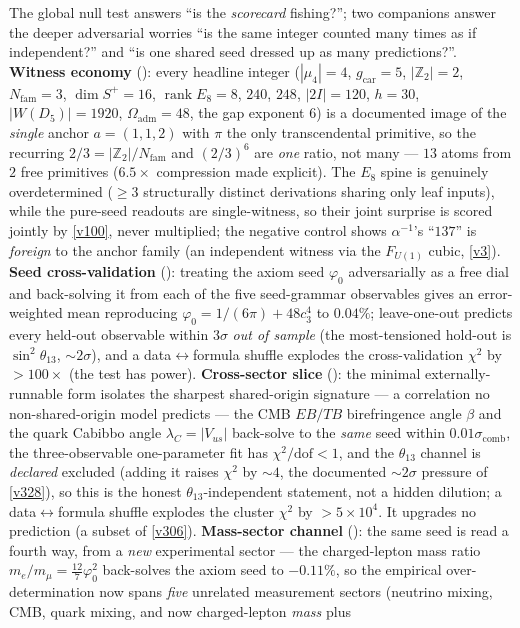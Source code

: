 \documentclass[11pt,a4paper]{article}
\newcommand{\cthree}{c_3}
\newcommand{\Nfam}{N_{\mathrm{fam}}}
\newcommand{\gcar}{g_{\mathrm{car}}}
\providecommand{\Z}{\mathbb{Z}}
\begin{document}
\begin{winbox}
The global null test answers ``is the \emph{scorecard} fishing?''; two companions answer the deeper adversarial worries ``is the same integer counted many times as if independent?'' and ``is one shared seed dressed up as many predictions?''. \textbf{Witness economy} (): every headline integer ($|\mu_4|{=}4$, $\gcar{=}5$, $|\Z_2|{=}2$, $\Nfam{=}3$, $\dim S^+{=}16$, $\operatorname{rank}E_8{=}8$, $240$, $248$, $|2I|{=}120$, $h{=}30$, $|W(D_5)|{=}1920$, $\Omega_{\mathrm{adm}}{=}48$, the gap exponent $6$) is a documented image of the \emph{single} anchor $a{=}(1,1,2)$ with $\pi$ the only transcendental primitive, so the recurring $2/3{=}|\Z_2|/\Nfam$ and $(2/3)^6$ are \emph{one} ratio, not many --- $13$ atoms from $2$ free primitives ($6.5\times$ compression made explicit). The $E_8$ spine is genuinely overdetermined ($\ge3$ structurally distinct derivations sharing only leaf inputs), while the pure-seed readouts are single-witness, so their joint surprise is scored jointly by \vref{v100}, never multiplied; the negative control shows $\alpha^{-1}$'s ``$137$'' is \emph{foreign} to the anchor family (an independent witness via the $F_{U(1)}$ cubic, \vref{v3}). \textbf{Seed cross-validation} (): treating the axiom seed $\varphi_0$ adversarially as a free dial and back-solving it from each of the five seed-grammar observables gives an error-weighted mean reproducing $\varphi_0=1/(6\pi)+48\cthree^4$ to $0.04\%$; leave-one-out predicts every held-out observable within $3\sigma$ \emph{out of sample} (the most-tensioned hold-out is $\sin^2\theta_{13}$, ${\sim}2\sigma$), and a data$\leftrightarrow$formula shuffle explodes the cross-validation $\chi^2$ by $>100\times$ (the test has power). \textbf{Cross-sector slice} (): the minimal externally-runnable form isolates the sharpest shared-origin signature --- a correlation no non-shared-origin model predicts --- the CMB $EB/TB$ birefringence angle $\beta$ and the quark Cabibbo angle $\lambda_C{=}|V_{us}|$ back-solve to the \emph{same} seed within $0.01\sigma_{\mathrm{comb}}$, the three-observable one-parameter fit has $\chi^2/\mathrm{dof}{<}1$, and the $\theta_{13}$ channel is \emph{declared} excluded (adding it raises $\chi^2$ by ${\sim}4$, the documented ${\sim}2\sigma$ pressure of \vref{v328}), so this is the honest $\theta_{13}$-independent statement, not a hidden dilution; a data$\leftrightarrow$formula shuffle explodes the cluster $\chi^2$ by ${>}5{\times}10^4$. It upgrades no prediction (a subset of \vref{v306}). \textbf{Mass-sector channel} (): the same seed is read a fourth way, from a \emph{new} experimental sector --- the charged-lepton mass ratio $m_e/m_\mu{=}\tfrac{12}{7}\varphi_0^2$ back-solves the axiom seed to $-0.11\%$, so the empirical over-determination now spans \emph{five} unrelated measurement sectors (neutrino mixing, CMB, quark mixing, and now charged-lepton \emph{mass} plus 
\end{winbox}
\end{document}

